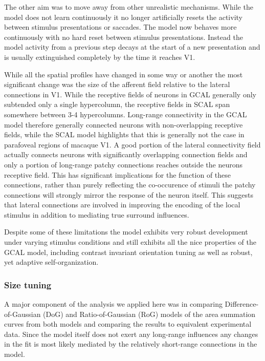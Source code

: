 The other aim was to move away from other unrealistic
mechanisms. While the model does not learn continuously it no longer
artificially resets the activity between stimulus presentations or
saccades. The model now behaves more continuously with no hard reset
between stimulus presentations. Instead the model activity from a
previous step decays at the start of a new presentation and is usually
extinguished completely by the time it reaches V1.

While all the spatial profiles have changed in some way or another the
most significant change was the size of the afferent field relative to
the lateral connections in V1. While the receptive fields of neurons
in GCAL generally only subtended only a single hypercolumn, the
receptive fields in SCAL span somewhere between 3-4
hypercolumns. Long-range connectivity in the GCAL model therefore
generally connected neurons with non-overlapping receptive fields,
while the SCAL model highlights that this is generally not the case in
parafoveal regions of macaque V1. A good portion of the lateral
connectivity field actually connects neurons with significantly
overlapping connection fields and only a portion of long-range patchy
connections reaches outside the neurons receptive field. This has
significant implications for the function of these connections, rather
than purely reflecting the co-occurence of stimuli the patchy
connections will strongly mirror the response of the neuron
itself. This suggests that lateral connections are involved in
improving the encoding of the local stimulus in addition to mediating
true surround influences.

Despite some of these limitations the model exhibits very robust
development under varying stimulus conditions and still exhibits all
the nice properties of the GCAL model, including contrast invariant
orientation tuning as well as robust, yet adaptive self-organization.

\subsubsection*{Size tuning}

A major component of the analysis we applied here was in comparing
Difference-of-Gaussian (DoG) and Ratio-of-Gaussian (RoG) models of the
area summation curves from both models and comparing the results to
equivalent experimental data. Since the model itself does not exert
any long-range influences any changes in the fit is most likely
mediated by the relatively short-range connections in the model.

